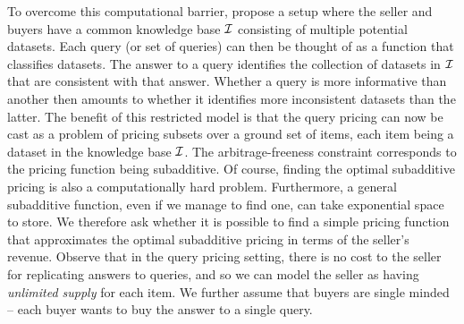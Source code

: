 To overcome this computational barrier, \citet{deep2017qirana} propose a setup where the seller and buyers have a common knowledge base $\mathcal{I}$ consisting of multiple potential datasets. Each query (or set of queries) can then be thought of as a function that classifies datasets. The answer to a query identifies the collection of datasets in $\mathcal{I}$ that are consistent with that answer. Whether a query is more informative than another then amounts to whether it identifies more inconsistent datasets than the latter. The benefit of this restricted model is that the query pricing can now be cast as a problem of pricing subsets over a ground set of items, each item being a dataset in the knowledge base $\mathcal{I}$. The arbitrage-freeness constraint corresponds to the pricing function being subadditive. Of course, finding the optimal subadditive pricing is also a computationally hard problem. Furthermore, a general subadditive function, even if we manage to find one, can take exponential space to store. We therefore ask whether it is possible to find a simple pricing function that approximates the optimal subadditive pricing in terms of the seller's revenue. Observe that in the query pricing setting, there is no cost to the seller for replicating answers to queries, and so we can model the seller as having {\em unlimited supply} for each item. We further assume that buyers are single minded -- each buyer wants to buy the answer to a single query.


